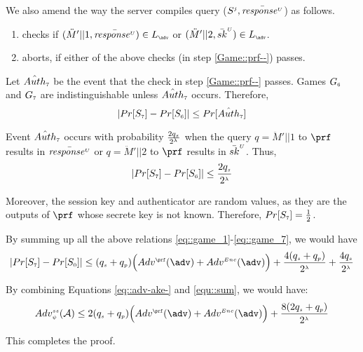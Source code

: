 \begin{itemize}
We also amend the way the server compiles query \send($S^{\scriptscriptstyle  j},   \bar{\mathit{response}^{\scriptscriptstyle U}}$) as follows. 
%
\begin{enumerate}[label=\alph*]
%
\item\label{Game::prf--}  checks if  $(\ddot M'||1, \bar{\VC{\mathit{response}}})\in L_{\sss \adv}$ or  $(\ddot M'||2, \bar {sk}^{\sss U})\in L_{\sss \adv}$. 
%
\item aborts, if either of the above checks (in step \ref{Game::prf--}) passes.
%
\end{enumerate}



 Let $\hat {Auth}_{\scriptscriptstyle  7}$ be the event that the check in step \ref{Game::prf--} passes. Games $G_{\scriptscriptstyle  6}$ and $G_{\scriptscriptstyle 7}$ are indistinguishable unless $\hat {Auth}_{\scriptscriptstyle  7}$ occurs. Therefore,
%
$$|Pr[S_{\scriptscriptstyle  7}]-Pr[S_{\scriptscriptstyle  6}]|\leq Pr[\hat {Auth}_{\scriptscriptstyle  7}]$$


Event $\hat {Auth}_{\scriptscriptstyle  7}$ occurs with probability $ \frac{2q_{\scriptscriptstyle  s}}{2^{\scriptscriptstyle \lambda}}$ when the query $q=\ddot M'||1$ to $\prf$ results in $\bar{\mathit{response}^{\scriptscriptstyle U}}$ or $q=\ddot M'||2$ to $\prf$ results in $\bar {sk}^{\scriptscriptstyle U}$. Thus, 
%
\begin{equation}\label{eq::game_7}
|Pr[S_{\scriptscriptstyle  7}]-Pr[S_{\scriptscriptstyle  6}]|\leq \frac{2q_{\scriptscriptstyle  s}}{2^{\scriptscriptstyle \lambda}}
\end{equation}

Moreover, the session key and authenticator are random values, as they are the outputs of $\prf$ whose secrete key is not known. Therefore, $Pr[S_{\scriptscriptstyle  7}]=\frac{1}{2}$. 



By summing up all the above relations \ref{eq::game_1}-\ref{eq::game_7}, we would have 
%
\begin{equation}\label{equ::sum}
|Pr[S_{\sss  7}]-Pr[S_{\sss  0}]|\leq (q_{\sss s}+q_{\sss p})\Big(Adv^{\sss\prf}(\adv)+Adv^{\sss Enc}(\adv)\Big)+\frac{4(q_{\sss  s}+q_{\sss  p})}{2^{\sss \lambda}}+\frac{4q_{\sss  s}}{2^{\sss \lambda}}
\end{equation}

By combining Equations \ref{eq::adv-ake-} and \ref{equ::sum}, we would have: 
%
\begin{equation*} 
Adv_{\sss  \psi}^{\sss  ss}(\A) \leq 2(q_{\sss s}+q_{\sss p})\Big(Adv^{\sss\prf}(\adv)+Adv^{\sss Enc}(\adv)\Big)+\frac{8(2q_{\sss  s}+q_{\sss  p})}{2^{\sss \lambda}}
\end{equation*}

This completes the proof. 


%

 

\end{itemize}

